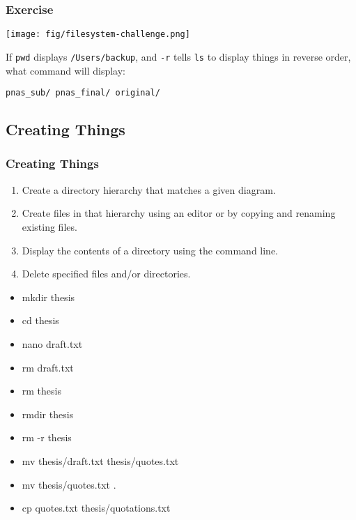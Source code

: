 \documentclass[xcolor=dvipsnames]{beamer}
\begin{document}
\begin{frame}
\frametitle{Exercise}

\texttt{[image: fig/filesystem-challenge.png]}

If \texttt{pwd} displays \texttt{/Users/backup}, and \texttt{-r} tells \texttt{ls} to display things in reverse order, what command will display:

\texttt{pnas\_sub/ pnas\_final/ original/}
\end{frame}

\subsection*{Creating Things}
\begin{frame}
\frametitle{Creating Things}
\begin{enumerate}
\item    Create a directory hierarchy that matches a given diagram.
\item    Create files in that hierarchy using an editor or by copying and renaming existing files.
\item    Display the contents of a directory using the command line.
\item    Delete specified files and/or directories.
\end{enumerate}
\begin{multicols}{2}
\begin{itemize}
\item mkdir thesis
\item cd thesis
\item nano draft.txt
\item rm draft.txt
\item rm thesis
\item rmdir thesis
\item rm -r thesis
\item mv thesis/draft.txt thesis/quotes.txt
\item mv thesis/quotes.txt .
\item cp quotes.txt thesis/quotations.txt
\end{itemize}
\end{multicols}
\end{frame}
\end{document}
